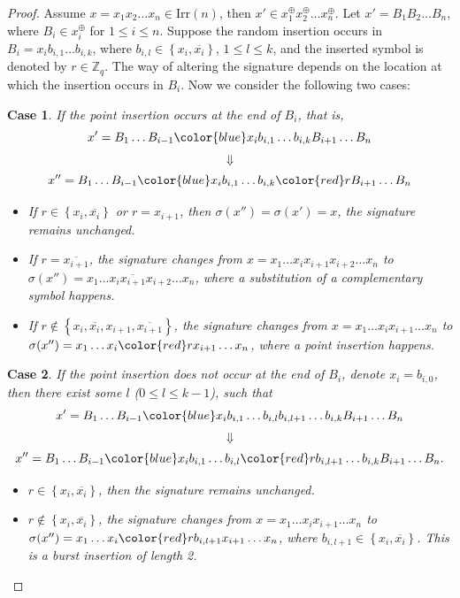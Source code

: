 \documentclass[pdflatex,sn-mathphys-num]{sn-jnl}
\theoremstyle{theorem}%
\newtheorem{case}{Case}
\theoremstyle{definition}
\theoremstyle{construction}
\newtheorem{open problem}{Open problem}
\begin{document}
\begin{proof}
	Assume $x=x_{1}x_{2}\ldots x_{n}\in \mathrm{Irr}(n)$, then $x'\in x_{1}^{\oplus}x_{2}^{\oplus}\ldots x_{n}^{\oplus}$. Let $x'= B_{1}B_{2}\ldots B_{n} $, where $B_{i}\in x_{i}^{\oplus}$ for $1\leq i \leq n$. Suppose the random insertion occurs in $B_{i} = x_{i} b_{i,1}\ldots b_{i,k}$, where $b_{i,l}\in \left \{ x_{i},\overline{ x_{i}} \right \}  $, $1\le l\le k$, and the inserted symbol is denoted by $r\in \mathbb{Z}_{q}$. The way of altering the signature depends on the location at which the insertion occurs in $B_{i}$. Now we consider the following two cases:
	\begin{case} 
		If the point insertion occurs at the end of $B_{i}$, that is, 
		$$x'=B_{1}\ldots B_{i-1}{\color{blue}x_{i}b_{i,1}\ldots b_{i,k} }B_{i+1}\ldots B_{n} $$ $$\Downarrow$$ $$x''=B_{1}\ldots B_{i-1}{\color{blue}x_{i}b_{i,1}\ldots b_{i,k}{\color{red}r} }B_{i+1}\ldots B_{n}$$
		
		\begin{itemize}
			\item[(i)] If $r\in \left \{ x_{i},\overline{ x_{i}} \right \}$ or $r=x_{i+1}$, then $\sigma(x'')=\sigma(x')=x$, the signature remains unchanged.
			\item [(ii)] If $r=\overline{x_{i+1}}$, the signature  changes from $x=x_{1}\ldots x_{i} x_{i+1}x_{i+2}\ldots x_{n}$ to $\sigma(x'')=x_{1}\ldots x_{i} \overline{x_{i+1}}x_{i+2}\ldots x_{n}$, where a substitution of a complementary symbol happens.
			\item[(iii)] If $r\notin  \left \{ x_{i},\overline{ x_{i}}, x_{i+1},  \overline{ x_{i+1}}\right \} $, the signature changes from $x=x_{1}\ldots x_{i} x_{i+1}\ldots x_{n}$ to $\sigma(x'')=x_{1}\ldots x_{i} {\color{red}r}x_{i+1}\ldots x_{n}$, where a point insertion happens.
		\end{itemize}
	\end{case}
	\begin{case}
		If the point insertion does not occur at the end of $B_{i}$, denote $x_{i} = b_{i,0}$, then there exist some $l$ ($0\le l\le k-1$), such that $$x'=B_{1}\ldots B_{i-1}{\color{blue}x_{i}b_{i,1}\ldots b_{i,l}b_{i,l+1} \ldots b_{i,k} }B_{i+1}\ldots B_{n}$$ $$\Downarrow$$ $$x''=B_{1}\ldots B_{i-1}{\color{blue}x_{i}b_{i,1}\ldots b_{i,l}{\color{red}r}b_{i,l+1} \ldots b_{i,k} }B_{i+1}\ldots B_{n}.$$
		\begin{itemize}
			\item[(i)] $r\in \left \{ x_{i},\overline{ x_{i}} \right \}$, then the signature remains unchanged.
			\item [(ii)] $r\notin \left \{ x_{i},\overline{ x_{i}} \right \}$, the signature changes from $x=x_{1}\ldots x_{i} x_{i+1}\ldots x_{n}$ to $\sigma(x'')=x_{1}\ldots x_{i} {\color{red}rb_{i,l+1}}x_{i+1}\ldots x_{n}$, where $b_{i,l+1}\in  \left \{ x_{i},\overline{ x_{i}} \right \}$. This is a burst insertion of length 2.
		\end{itemize}
	\end{case}
\end{proof}
\end{document}
